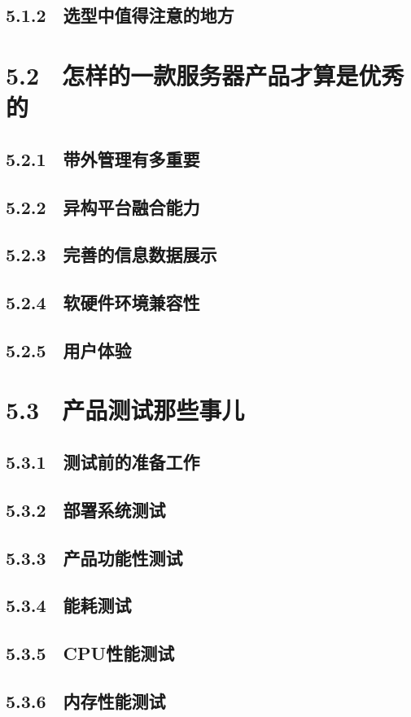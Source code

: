 \documentclass[12pt,UTF8]{ctexbook}
\begin{document}
\subsection{5.1.2　选型中值得注意的地方}
\section{5.2　怎样的一款服务器产品才算是优秀的}
\subsection{5.2.1　带外管理有多重要}
\subsection{5.2.2　异构平台融合能力}
\subsection{5.2.3　完善的信息数据展示}
\subsection{5.2.4　软硬件环境兼容性}
\subsection{5.2.5　用户体验}
\section{5.3　产品测试那些事儿}
\subsection{5.3.1　测试前的准备工作}
\subsection{5.3.2　部署系统测试}
\subsection{5.3.3　产品功能性测试}
\subsection{5.3.4　能耗测试}
\subsection{5.3.5　CPU性能测试}
\subsection{5.3.6　内存性能测试}
\end{document}
